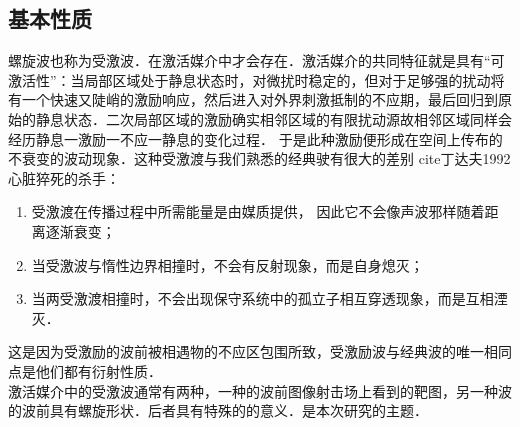 \subsection{基本性质}
螺旋波也称为受激波．在激活媒介中才会存在．激活媒介的共同特征就是具有“可激活性”：当局部区域处于静息状态时，对微扰时稳定的，但对于足够强的扰动将有一个快速又陡峭的激励响应，然后进入对外界刺激抵制的不应期，最后回归到原始的静息状态．二次局部区域的激励确实相邻区域的有限扰动源故相邻区域同样会经历静息一激励一不应一静息的变化过程． 于是此种激励便形成在空间上传布的不衰变的波动现象．这种受激渡与我们熟悉的经典驶有很大的差别 cite{丁达夫1992心脏猝死的杀手}：
\begin{enumerate}
  \item 受激渡在传播过程中所需能量是由媒质提供， 因此它不会像声波邪样随着距离逐渐衰变；
  \item 当受激波与惰性边界相撞时，不会有反射现象，而是自身熄灭；
  \item 当两受激渡相撞时，不会出现保守系统中的孤立子相互穿透现象，而是互相湮灭．
\end{enumerate}
这是因为受激励的波前被相遇物的不应区包围所致，受激励波与经典波的唯一相同点是他们都有衍射性质．\\
激活媒介中的受激波通常有两种，一种的波前图像射击场上看到的靶图，另一种波的波前具有螺旋形状．后者具有特殊的的意义．是本次研究的主题．

